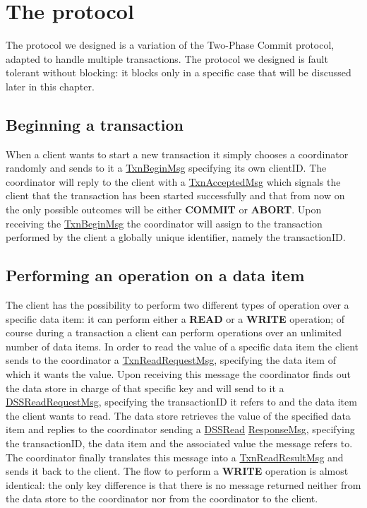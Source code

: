 \section{The protocol}
The protocol we designed is a variation of the Two-Phase Commit protocol, adapted to handle multiple transactions. The protocol we designed is fault tolerant without blocking: it blocks only in a specific case that will be discussed later in this chapter.

\subsection{Beginning a transaction}
When a client wants to start a new transaction it simply chooses a coordinator randomly and sends to it a \url{TxnBeginMsg} specifying its own clientID.
\newline
The coordinator will reply to the client with a \url{TxnAcceptedMsg} which signals the client that the transaction has been started successfully and that from now on the only possible outcomes will be either \textbf{COMMIT} or \textbf{ABORT}. Upon receiving the \url{TxnBeginMsg} the coordinator will assign to the transaction performed by the client a globally unique identifier, namely the transactionID.

\subsection{Performing an operation on a data item}
The client has the possibility to perform two different types of operation over a specific data item: it can perform either a \textbf{READ} or a \textbf{WRITE} operation; of course during a transaction a client can perform operations over an unlimited number of data items.
\newline
In order to read the value of a specific data item the client sends to the coordinator a \url{TxnReadRequestMsg}, specifying the data item of which it wants the value. Upon receiving this message the coordinator finds out the data store in charge of that specific key and will send to it a \url{DSSReadRequestMsg}, specifying the transactionID it refers to and the data item the client wants to read.
\newline
The data store retrieves the value of the specified data item and replies to the coordinator sending a \url{DSSRead} \url{ResponseMsg}, specifying the transactionID, the data item and the associated value the message refers to.
\newline
The coordinator finally translates this message into a \url{TxnReadResultMsg} and sends it back to the client.
\newline
The flow to perform a \textbf{WRITE} operation is almost identical: the only key difference is that there is no message returned neither from the data store to the coordinator nor from the coordinator to the client.

